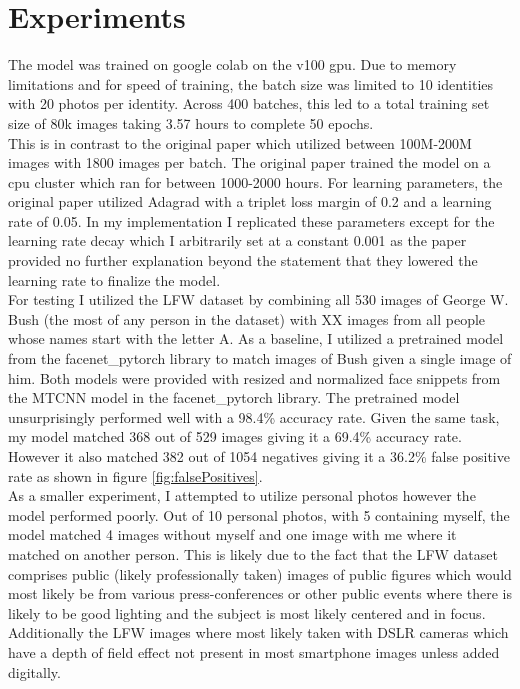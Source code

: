 \documentclass[10pt,twocolumn,letterpaper]{article}
\begin{document}
\section{Experiments}
The model was trained on google colab on the v100 gpu.
Due to memory limitations and for speed of training, the batch size was limited to 10 identities with 20 photos per identity.
Across 400 batches, this led to a total training set size of 80k images taking 3.57 hours to complete 50 epochs.\\
This is in contrast to the original paper which utilized between 100M-200M images with 1800 images per batch.
The original paper trained the model on a cpu cluster which ran for between 1000-2000 hours.
For learning parameters, the original paper utilized Adagrad with a triplet loss margin of 0.2 and a learning rate of 0.05.
In my implementation I replicated these parameters except for the learning rate decay which I arbitrarily set at a constant 0.001 as the paper provided no further explanation beyond the statement that they lowered the learning rate to finalize the model.\\

For testing I utilized the LFW dataset by combining all 530 images of George W. Bush (the most of any person in the dataset) with XX images from all people whose names start with the letter A.
As a baseline, I utilized a pretrained model from the facenet\_pytorch library to match images of Bush given a single image of him.
Both models were provided with resized and normalized face snippets from the MTCNN model in the facenet\_pytorch library.
The pretrained model unsurprisingly performed well with a 98.4\% accuracy rate.
Given the same task, my model matched 368 out of 529 images giving it a 69.4\% accuracy rate.
However it also matched 382 out of 1054 negatives giving it a 36.2\% false positive rate as shown in figure \ref{fig:falsePositives}.\\

As a smaller experiment, I attempted to utilize personal photos however the model performed poorly.
Out of 10 personal photos, with 5 containing myself, the model matched 4 images without myself and one image with me where it matched on another person.
This is likely due to the fact that the LFW dataset comprises public (likely professionally taken) images of public figures which would most likely be from various press-conferences or other public events where there is likely to be good lighting and the subject is most likely centered and in focus.
Additionally the LFW images where most likely taken with DSLR cameras which have a depth of field effect not present in most smartphone images unless added digitally.
\end{document}
